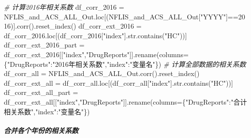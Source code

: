 \documentclass[
]{article}
\newenvironment{Shaded}{}{}
\newcommand{\BuiltInTok}[1]{#1}
\newcommand{\CommentTok}[1]{\textcolor[rgb]{0.38,0.63,0.69}{\textit{#1}}}
\newcommand{\DecValTok}[1]{\textcolor[rgb]{0.25,0.63,0.44}{#1}}
\newcommand{\NormalTok}[1]{#1}
\newcommand{\OperatorTok}[1]{\textcolor[rgb]{0.40,0.40,0.40}{#1}}
\newcommand{\StringTok}[1]{\textcolor[rgb]{0.25,0.44,0.63}{#1}}
\begin{document}
\begin{Shaded}
\begin{Highlighting}[]
\CommentTok{\# 计算2016年相关系数}
\NormalTok{df\_corr\_2016 }\OperatorTok{=}\NormalTok{ NFLIS\_and\_ACS\_ALL\_Out.loc[(NFLIS\_and\_ACS\_ALL\_Out[}\StringTok{"YYYY"}\NormalTok{]}\OperatorTok{==}\DecValTok{2016}\NormalTok{)].corr().reset\_index()}
\NormalTok{df\_corr\_ext\_2016 }\OperatorTok{=}\NormalTok{ df\_corr\_2016.loc[(df\_corr\_2016[}\StringTok{"index"}\NormalTok{].}\BuiltInTok{str}\NormalTok{.contains(}\StringTok{"HC"}\NormalTok{))]}
\NormalTok{df\_corr\_ext\_2016\_part }\OperatorTok{=}\NormalTok{ df\_corr\_ext\_2016[[}\StringTok{"index"}\NormalTok{,}\StringTok{"DrugReports"}\NormalTok{]].rename(columns}\OperatorTok{=}\NormalTok{\{}\StringTok{"DrugReports"}\NormalTok{:}\StringTok{"2016年相关系数"}\NormalTok{,}\StringTok{"index"}\NormalTok{:}\StringTok{"变量名"}\NormalTok{\})}
\CommentTok{\# 计算全部数据的相关系数}
\NormalTok{df\_corr\_all }\OperatorTok{=}\NormalTok{ NFLIS\_and\_ACS\_ALL\_Out.corr().reset\_index()}
\NormalTok{df\_corr\_ext\_all }\OperatorTok{=}\NormalTok{ df\_corr\_all.loc[(df\_corr\_all[}\StringTok{"index"}\NormalTok{].}\BuiltInTok{str}\NormalTok{.contains(}\StringTok{"HC"}\NormalTok{))]}
\NormalTok{df\_corr\_ext\_all\_part }\OperatorTok{=}\NormalTok{ df\_corr\_ext\_all[[}\StringTok{"index"}\NormalTok{,}\StringTok{"DrugReports"}\NormalTok{]].rename(columns}\OperatorTok{=}\NormalTok{\{}\StringTok{"DrugReports"}\NormalTok{:}\StringTok{"合计相关系数"}\NormalTok{,}\StringTok{"index"}\NormalTok{:}\StringTok{"变量名"}\NormalTok{\})}
\end{Highlighting}
\end{Shaded}

\hypertarget{header-n267}{%
\subparagraph{合并各个年份的相关系数}\label{header-n267}}
\end{document}
